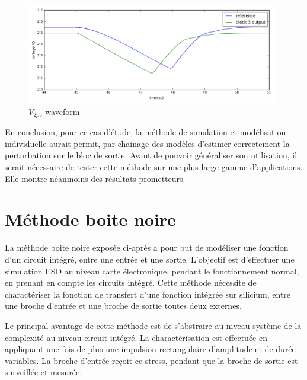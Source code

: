 \begin{figure}[!h]
  \centering
  \includegraphics[width=0.98\textwidth]{src/1/figures/simulation_comparison_block3.png}
  \caption{$V_{2p5}$ waveform}
  \label{fig:sim-compare-block3}
\end{figure}

En conclusion, pour ce cas d'étude, la méthode de simulation et modélisation individuelle aurait permit, par chainage des modèles d'estimer correctement la perturbation sur le bloc de sortie.
Avant de pouvoir généraliser son utilisation, il serait nécessaire de tester cette méthode sur une plus large gamme d'applications.
Elle montre néanmoins des résultats prometteurs.

\section{Méthode boite noire}

La méthode boite noire exposée ci-après a pour but de modéliser une fonction d'un circuit intégré, entre une entrée et une sortie.
L'objectif est d'effectuer une simulation ESD au niveau carte électronique, pendant le fonctionnement normal, en prenant en compte les circuits intégré.
Cette méthode nécessite de charactériser la fonction de transfert d'une fonction intégrée sur silicium, entre une broche d'entrée et une broche de sortie toutes deux externes.

Le principal avantage de cette méthode est de s'abstraire au niveau système de la complexité au niveau circuit intégré.
La charactérisation est effectuée en appliquant une fois de plus une impulsion rectangulaire d'amplitude et de durée variables.
La broche d'entrée reçoit ce stress, pendant que la broche de sortie est surveillée et mesurée.

